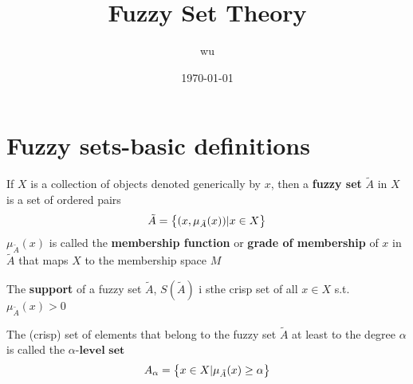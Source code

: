 \documentclass[11pt]{article}
\author{wu}
\date{\today}
\title{Fuzzy Set Theory}
\begin{document}
\maketitle
\tableofcontents


\section{Fuzzy sets-basic definitions}
\label{sec:org31e9e8f}

If \(X\) is a collection of objects denoted generically by \(x\), then a \textbf{fuzzy set}
\(\tilde{A}\) in \(X\) is a set of ordered pairs
\begin{equation*}
\tilde{A}=\left\{(x,\mu_{\tilde{A}}(x))|x\in X\right\}
\end{equation*}
\(\mu_{\tilde{A}}(x)\) is called the \textbf{membership function} or \textbf{grade of membership}
of \(x\) in \(\tilde{A}\) that maps \(X\) to the membership space \(M\)

The \textbf{support} of a fuzzy set \(\tilde{A}\), \(S(\tilde{A})\) i sthe crisp set of all
\(x\in X\) s.t. \(\mu_{\tilde{A}}(x)>0\)

The (crisp) set of elements that belong to the fuzzy set \(\tilde{A}\) at least
to the degree \(\alpha\) is called the \(\alpha\textbf{-level set}\)
\begin{equation*}
A_\alpha=\left\{ x\in X|\mu_{\tilde{A}}(x)\ge \alpha\right\}
\end{equation*}
\end{document}
